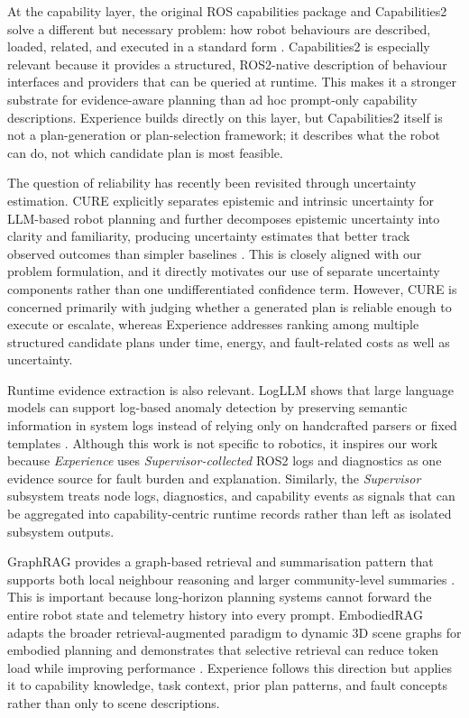 \documentclass[letterpaper, 10pt, conference]{ieeeconf}
\begin{document}
At the capability layer, the original ROS capabilities package and Capabilities2 solve a different but necessary problem: how robot behaviours are described, loaded, related, and executed in a standard form \cite{woodall_ros_2014, pritchard_capabilities2_2025}. Capabilities2 is especially relevant because it provides a structured, ROS2-native description of behaviour interfaces and providers that can be queried at runtime. This makes it a stronger substrate for evidence-aware planning than ad hoc prompt-only capability descriptions. Experience builds directly on this layer, but Capabilities2 itself is not a plan-generation or plan-selection framework; it describes what the robot can do, not which candidate plan is most feasible.

The question of reliability has recently been revisited through uncertainty estimation. CURE explicitly separates epistemic and intrinsic uncertainty for LLM-based robot planning and further decomposes epistemic uncertainty into clarity and familiarity, producing uncertainty estimates that better track observed outcomes than simpler baselines \cite{yin2025reliablellmbasedrobotplanning}. This is closely aligned with our problem formulation, and it directly motivates our use of separate uncertainty components rather than one undifferentiated confidence term. However, CURE is concerned primarily with judging whether a generated plan is reliable enough to execute or escalate, whereas Experience addresses ranking among multiple structured candidate plans under time, energy, and fault-related costs as well as uncertainty.

Runtime evidence extraction is also relevant. LogLLM shows that large language models can support log-based anomaly detection by preserving semantic information in system logs instead of relying only on handcrafted parsers or fixed templates \cite{guan2025logllmlogbasedanomalydetection}. Although this work is not specific to robotics, it inspires our work because \textit{Experience} uses \textit{Supervisor-collected} ROS2 logs and diagnostics as one evidence source for fault burden and explanation. Similarly, the \textit{Supervisor} subsystem treats node logs, diagnostics, and capability events as signals that can be aggregated into capability-centric runtime records rather than left as isolated subsystem outputs.

GraphRAG provides a graph-based retrieval and summarisation pattern that supports both local neighbour reasoning and larger community-level summaries \cite{edge2025localglobalgraphrag}. This is important because long-horizon planning systems cannot forward the entire robot state and telemetry history into every prompt. EmbodiedRAG adapts the broader retrieval-augmented paradigm to dynamic 3D scene graphs for embodied planning and demonstrates that selective retrieval can reduce token load while improving performance \cite{booker2024embodiedragdynamic3dscene}. Experience follows this direction but applies it to capability knowledge, task context, prior plan patterns, and fault concepts rather than only to scene descriptions.
\end{document}
